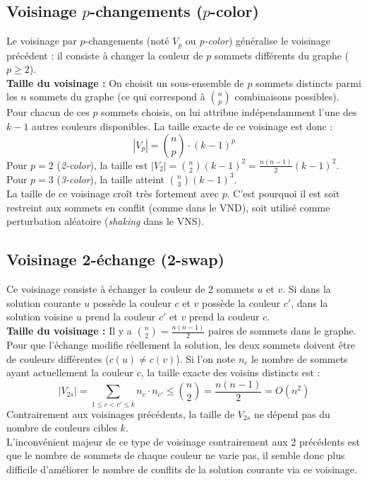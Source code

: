 \documentclass{article}
\begin{document}
\subsection{Voisinage $p$-changements ($p$-color)}
Le voisinage par $p$-changements (noté $V_p$ ou \textit{p-color}) généralise le voisinage précédent : il consiste à changer la couleur de $p$ sommets différents du graphe ($p \ge 2$).\\
\textbf{Taille du voisinage : } On choisit un sous-ensemble de $p$ sommets distincts parmi les $n$ sommets du graphe (ce qui correspond à $\binom{n}{p}$ combinaisons possibles). Pour chacun de ces $p$ sommets choisis, on lui attribue indépendamment l'une des $k - 1$ autres couleurs disponibles. La taille exacte de ce voisinage est donc :
\[
|V_p| = \binom{n}{p} \cdot (k - 1)^p
\]
Pour $p = 2$ (\textit{2-color}), la taille est $|V_2| = \binom{n}{2}(k - 1)^2 = \frac{n(n-1)}{2}(k-1)^2$. Pour $p = 3$ (\textit{3-color}), la taille atteint $\binom{n}{3}(k-1)^3$.\\
La taille de ce voisinage croît très fortement avec $p$. C'est pourquoi il est soit restreint aux sommets en conflit (comme dans le VND), soit utilisé comme perturbation aléatoire (\textit{shaking} dans le VNS).

\subsection{Voisinage 2-échange (2-swap)}
Ce voisinage consiste à échanger la couleur de 2 sommets $u$ et $v$. Si dans la solution courante $u$ possède la couleur $c$ et $v$ possède la couleur $c'$, dans la solution voisine $u$ prend la couleur $c'$ et $v$ prend la couleur $c$.\\
\textbf{Taille du voisinage : } Il y a $\binom{n}{2} = \frac{n(n-1)}{2}$ paires de sommets dans le graphe. Pour que l'échange modifie réellement la solution, les deux sommets doivent être de couleurs différentes ($c(u) \neq c(v)$). Si l'on note $n_c$ le nombre de sommets ayant actuellement la couleur $c$, la taille exacte des voisins distincts est :
\[
|V_{2s}| = \sum_{1 \le c < c' \le k} n_c \cdot n_{c'} \le \binom{n}{2} = \frac{n(n-1)}{2} = O(n^2)
\]
Contrairement aux voisinages précédents, la taille de $V_{2s}$ ne dépend pas du nombre de couleurs cibles $k$.\\

L'inconvénient majeur de ce type de voisinage contrairement aux 2 précédents est que le nombre de sommets de chaque couleur ne varie pas, il semble donc plus difficile d'améliorer le nombre de conflits de la solution courante via ce voisinage.
\end{document}
